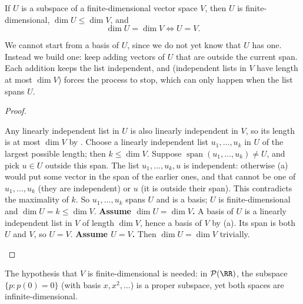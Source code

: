 \documentclass[10pt]{scrartcl}
\DeclareMathOperator{\spn}{span}
\newcommand{\PP}{\mathcal P}
\begin{document}
\begin{proposition*}
  If $U$ is a subspace of a finite-dimensional vector space $V$, then $U$ is finite-dimensional, $\dim U\le\dim V$, and
  \[
    \dim U = \dim V \iff U = V.
  \]
\end{proposition*}
\begin{ideabox}
  We cannot start from a basis of $U$, since we do not yet know that $U$ has one. Instead we build one: keep adding vectors of $U$ that are outside the current span. Each addition keeps the list independent, and  (independent lists in $V$ have length at most $\dim V$) forces the process to stop, which can only happen when the list spans $U$.
\end{ideabox}
\begin{proof}
  \begin{steps}
    \ii Any linearly independent list in $U$ is also linearly independent in $V$, so its length is at most $\dim V$ by . Choose a linearly independent list $u_1,\dots,u_k$ in $U$ of the largest possible length; then $k\le\dim V$.
    \ii Suppose $\spn(u_1,\dots,u_k)\ne U$, and pick $u\in U$ outside this span. The list $u_1,\dots,u_k,u$ is independent: otherwise (a) would put some vector in the span of the earlier ones, and that cannot be one of $u_1,\dots,u_k$ (they are independent) or $u$ (it is outside their span). This contradicts the maximality of $k$. So $u_1,\dots,u_k$ spans $U$ and is a basis; $U$ is finite-dimensional and $\dim U=k\le\dim V$.
    \ii \textbf{Assume $\dim U=\dim V$.} A basis of $U$ is a linearly independent list in $V$ of length $\dim V$, hence a basis of $V$ by (a). Its span is both $U$ and $V$, so $U=V$. \textbf{Assume $U=V$.} Then $\dim U=\dim V$ trivially.
  \end{steps}
\end{proof}

The hypothesis that $V$ is finite-dimensional is needed: in $\PP(\RR)$, the subspace $\{p:p(0)=0\}$ (with basis $x,x^2,\dots$) is a proper subspace, yet both spaces are infinite-dimensional.
\end{document}
